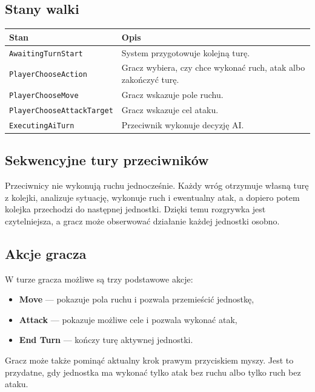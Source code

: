 \documentclass[12pt,a4paper]{article}
\begin{document}
\subsection{Stany walki}

\begin{longtable}{p{5cm} p{9cm}}
\toprule
\textbf{Stan} & \textbf{Opis} \\
\midrule
\endhead
\texttt{AwaitingTurnStart} & System przygotowuje kolejną turę. \\[4pt]
\texttt{PlayerChooseAction} & Gracz wybiera, czy chce wykonać ruch, atak albo zakończyć turę. \\[4pt]
\texttt{PlayerChooseMove} & Gracz wskazuje pole ruchu. \\[4pt]
\texttt{PlayerChooseAttackTarget} & Gracz wskazuje cel ataku. \\[4pt]
\texttt{ExecutingAiTurn} & Przeciwnik wykonuje decyzję AI. \\
\bottomrule
\end{longtable}

\subsection{Sekwencyjne tury przeciwników}

Przeciwnicy nie wykonują ruchu jednocześnie. Każdy wróg otrzymuje własną turę z kolejki, analizuje sytuację, wykonuje ruch i ewentualny atak, a dopiero potem kolejka przechodzi do następnej jednostki. Dzięki temu rozgrywka jest czytelniejsza, a gracz może obserwować działanie każdej jednostki osobno.

\subsection{Akcje gracza}

W turze gracza możliwe są trzy podstawowe akcje:

\begin{itemize}
    \item \textbf{Move} --- pokazuje pola ruchu i pozwala przemieścić jednostkę,
    \item \textbf{Attack} --- pokazuje możliwe cele i pozwala wykonać atak,
    \item \textbf{End Turn} --- kończy turę aktywnej jednostki.
\end{itemize}

Gracz może także pominąć aktualny krok prawym przyciskiem myszy. Jest to przydatne, gdy jednostka ma wykonać tylko atak bez ruchu albo tylko ruch bez ataku.
\end{document}
